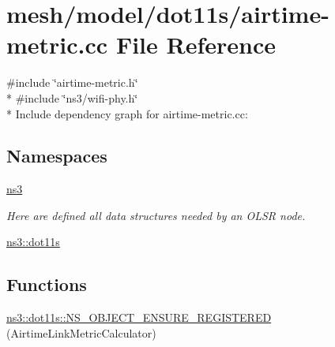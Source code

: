 \hypertarget{airtime-metric_8cc}{}\section{mesh/model/dot11s/airtime-\/metric.cc File Reference}
\label{airtime-metric_8cc}
{\ttfamily \#include \char`\"{}airtime-\/metric.\+h\char`\"{}}\\*
{\ttfamily \#include \char`\"{}ns3/wifi-\/phy.\+h\char`\"{}}\\*
Include dependency graph for airtime-\/metric.cc\+:
\subsection*{Namespaces}
\begin{DoxyCompactItemize}
\item 
 \hyperlink{namespacens3}{ns3}
\begin{DoxyCompactList}\small\item\em Here are defined all data structures needed by an O\+L\+SR node. \end{DoxyCompactList}\item 
 \hyperlink{namespacens3_1_1dot11s}{ns3\+::dot11s}
\end{DoxyCompactItemize}
\subsection*{Functions}
\begin{DoxyCompactItemize}
\item 
\hyperlink{namespacens3_1_1dot11s_a60526dc00bc960a3096608388a6972fc}{ns3\+::dot11s\+::\+N\+S\+\_\+\+O\+B\+J\+E\+C\+T\+\_\+\+E\+N\+S\+U\+R\+E\+\_\+\+R\+E\+G\+I\+S\+T\+E\+R\+ED} (Airtime\+Link\+Metric\+Calculator)
\end{DoxyCompactItemize}
